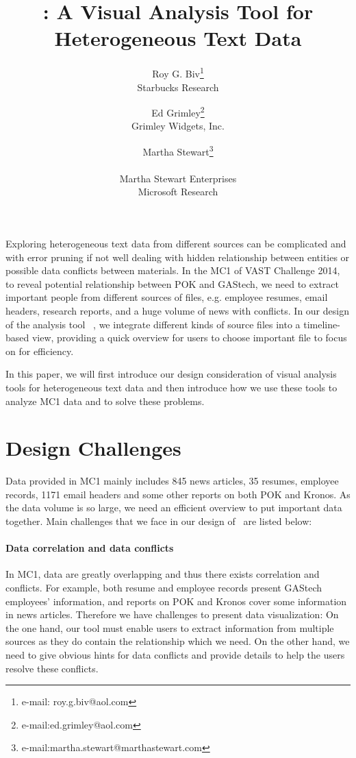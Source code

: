 \documentclass{vgtc}                          %
\title{\projectname: A Visual Analysis Tool for Heterogeneous Text Data}
\author{Roy G. Biv\thanks{e-mail: roy.g.biv@aol.com}\\ %
        \scriptsize Starbucks Research %
\and Ed Grimley\thanks{e-mail:ed.grimley@aol.com}\\ %
     \scriptsize Grimley Widgets, Inc. %
\and Martha Stewart\thanks{e-mail:martha.stewart@marthastewart.com}\\ %
     \parbox{1.4in}{\scriptsize \centering Martha Stewart Enterprises \\ Microsoft Research}}
\begin{document}


\maketitle

Exploring heterogeneous text data from different sources can be complicated and with error pruning if not well dealing with hidden relationship between entities or possible data conflicts between materials. 
In the MC1 of VAST Challenge 2014, to reveal potential relationship between POK and GAStech, we need to extract important people from different sources of files, e.g. employee resumes, email headers, research reports, and a huge volume of news with conflicts. 
In our design of the analysis tool \projectname\ , we integrate different kinds of source files into a timeline-based view, providing a quick overview for users to choose important file to focus on for efficiency. 
\par
In this paper, we will first introduce our design consideration of visual analysis tools for heterogeneous text data and then introduce how we use these tools to analyze MC1 data and to solve these problems.


\section{Design Challenges}
Data provided in MC1 mainly includes 845 news articles, 35 resumes, employee records, 1171 email headers and some other reports on both POK and Kronos. As the data volume is so large, we need an efficient overview to put important data together. Main challenges that we face in our design of \projectname\ are listed below:
\paragraph{Data correlation and data conflicts}
In MC1, data are greatly overlapping and thus there exists correlation and conflicts. For example, both resume and employee records present GAStech employees' information, and reports on POK and Kronos cover some information in news articles. Therefore we have challenges to present data visualization: On the one hand, our tool must enable users to extract information from multiple sources as they do contain the relationship which we need. On the other hand, we need to give obvious hints for data conflicts and provide details to help the users resolve these conflicts. 
\end{document}
